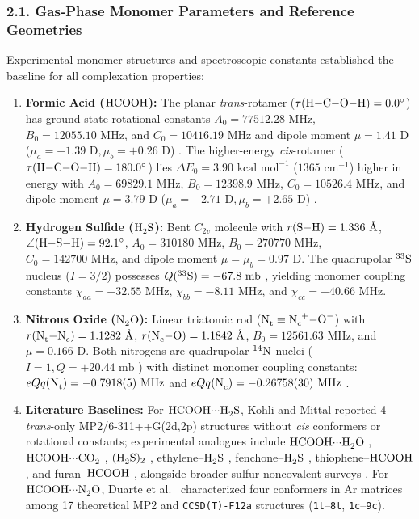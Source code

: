 \documentclass[journal=jpclcd,manuscript=article]{achemso}
\begin{document}
\subsubsection{2.1. Gas-Phase Monomer Parameters and Reference Geometries}
Experimental monomer structures and spectroscopic constants established the baseline for all complexation properties:
\begin{enumerate}
  \item \textbf{Formic Acid ($\ce{HCOOH}$):} The planar \textit{trans}-rotamer ($\tau(\ce{H-C-O-H}) = 0.0^\circ$) has ground-state rotational constants $A_0 = 77512.28\text{ MHz}$, $B_0 = 12055.10\text{ MHz}$, and $C_0 = 10416.19\text{ MHz}$ and dipole moment $\mu = 1.41\text{ D}$ ($\mu_a = -1.39\text{ D}, \mu_b = +0.26\text{ D}$) \cite{Winnewisser2002}. The higher-energy \textit{cis}-rotamer ($\tau(\ce{H-C-O-H}) = 180.0^\circ$) lies $\Delta E_0 = 3.90\text{ kcal mol}^{-1}$ ($1365\text{ cm}^{-1}$) higher in energy with $A_0 = 69829.1\text{ MHz}$, $B_0 = 12398.9\text{ MHz}$, $C_0 = 10526.4\text{ MHz}$, and dipole moment $\mu = 3.79\text{ D}$ ($\mu_a = -2.71\text{ D}, \mu_b = +2.65\text{ D}$) \cite{Winnewisser2002}.
  \item \textbf{Hydrogen Sulfide ($\ce{H2S}$):} Bent $C_{2v}$ molecule with $r(\ce{S-H}) = 1.336\text{ \AA}$, $\angle(\ce{H-S-H}) = 92.1^\circ$, $A_0 = 310180\text{ MHz}$, $B_0 = 270770\text{ MHz}$, $C_0 = 142700\text{ MHz}$, and dipole moment $\mu = \mu_b = 0.97\text{ D}$. The quadrupolar $^{33}\ce{S}$ nucleus ($I = 3/2$) possesses $Q(^{33}\ce{S}) = -67.8\text{ mb}$ \cite{Pyykko2018}, yielding monomer coupling constants $\chi_{aa} = -32.55\text{ MHz}$, $\chi_{bb} = -8.11\text{ MHz}$, and $\chi_{cc} = +40.66\text{ MHz}$.
  \item \textbf{Nitrous Oxide ($\ce{N2O}$):} Linear triatomic rod ($\ce{N_t\equiv N_c^+-O^-}$) with $r(\ce{N_t-N_c}) = 1.1282\text{ \AA}$, $r(\ce{N_c-O}) = 1.1842\text{ \AA}$, $B_0 = 12561.63\text{ MHz}$, and $\mu = 0.166\text{ D}$. Both nitrogens are quadrupolar $^{14}\ce{N}$ nuclei ($I = 1, Q = +20.44\text{ mb}$ \cite{Pyykko2018}) with distinct monomer coupling constants: $eQq(\ce{N_t}) = -0.7918(5)\text{ MHz}$ and $eQq(\ce{N_c}) = -0.26758(30)\text{ MHz}$ \cite{Pyykko2018, Duarte2017}.
  \item \textbf{Literature Baselines:} For $\ce{HCOOH\bond{...}H2S}$, Kohli and Mittal \cite{Kohli2022} reported 4 \textit{trans}-only MP2/6-311++G(2d,2p) structures without \textit{cis} conformers or rotational constants; experimental analogues include $\ce{HCOOH\bond{...}H2O}$ \cite{Priem2000}, $\ce{HCOOH\bond{...}CO2}$ \cite{Li2015}, $(\ce{H2S})_2$ \cite{Das2018, Biswas2024}, ethylene--$\ce{H2S}$ \cite{Goswami2011}, fenchone--$\ce{H2S}$ \cite{Medcraft2022}, thiophene--$\ce{HCOOH}$ \cite{Obenchain2022}, and furan--$\ce{HCOOH}$ \cite{Evangelisti2013}, alongside broader sulfur noncovalent surveys \cite{Juanes2019}. For $\ce{HCOOH\bond{...}N2O}$, Duarte et al.\ \cite{Duarte2017} characterized four conformers in Ar matrices among 17 theoretical MP2 and \texttt{CCSD(T)-F12a} \cite{Adler2007} structures (\texttt{1t}--\texttt{8t}, \texttt{1c}--\texttt{9c}).
\end{enumerate}
\end{document}
